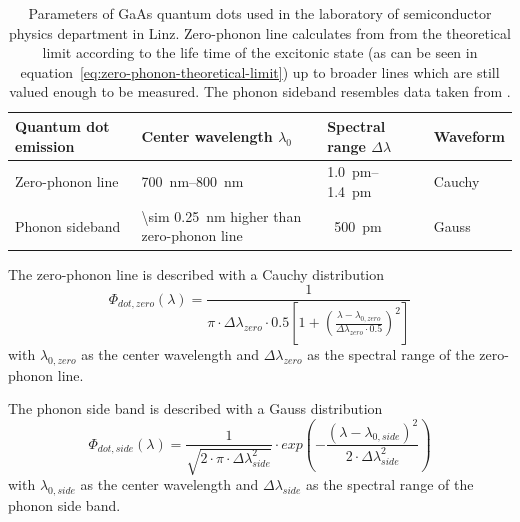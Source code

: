 \begin{table}[H]
	\caption[Paramters of GaAs quantum dots used in the laboratory of semiconductor physics department in Linz.]{Parameters of GaAs quantum dots used in the laboratory of semiconductor physics department in Linz.
	Zero-phonon line calculates from from the theoretical limit according to the life time of the excitonic state (as can be seen in equation~\eqref{eq:zero-phonon-theoretical-limit}) up to broader lines which are still valued enough to be measured.
	The phonon sideband resembles data taken from \textcite{scholl_resonance_2019}.}
	\label{tab:quantum-dot-emission}
	\begin{tabular}{@{}llll@{}}
		\toprule
		Quantum dot emission & Center wavelength $\lambda_0$           & Spectral range $\Delta \lambda$ & Waveform                  \\ \midrule
		Zero-phonon line               & \SIrange{700}{800}{\nano \metre} & \SIrange{1.0}{1.4}{\pico \metre} & Cauchy\\
		Phonon sideband       & \SI{\sim 0.25}{\nano \metre} higher than zero-phonon line  & ~\SI{500}{\pico \metre} & Gauss  \\ \bottomrule
	\end{tabular}
\end{table}

The zero-phonon line is described with a Cauchy distribution
\begin{equation}
\Phi_{dot,zero}(\lambda) = \frac{1}{\pi \cdot \Delta\lambda_{zero} \cdot 0.5 \left[1+\left(\frac{\lambda - \lambda_{0, zero}}{\Delta\lambda_{zero} \cdot 0.5}\right)^2\right]}
\end{equation}
with $\lambda_{0, zero}$ as the center wavelength and $\Delta\lambda_{zero}$ as the spectral range of the zero-phonon line.

The phonon side band is described with a Gauss distribution
\begin{equation}
\Phi_{dot,side}(\lambda) = \frac{1}{\sqrt{2\cdot\pi\cdot \Delta\lambda_{side}^2}}\cdot exp\left(-\frac{(\lambda - \lambda_{0, side})^2}{2\cdot \Delta\lambda_{side}^2}\right)
\end{equation}
with $\lambda_{0, side}$ as the center wavelength and $\Delta\lambda_{side}$ as the spectral range of the phonon side band.

